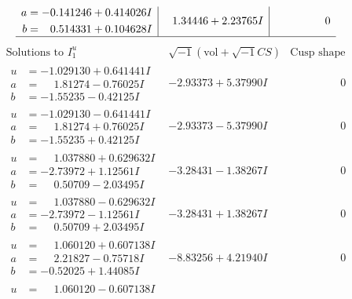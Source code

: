 \documentclass[1p]{elsarticle_modified}
\theoremstyle{definition}
\newcommand{\I}{\sqrt{-1}}
\begin{document}
$$\begin{array}{c|c|c}
\begin{aligned}
a &= -0.141246 + 0.414026 I \\
b &= \phantom{-}0.514331 + 0.104628 I\end{aligned}
 & \phantom{-}1.34446 + 2.23765 I & \phantom{-0.000000 } 0\\
 \hline 
 \end{array}$$\newpage$$\begin{array}{c|c|c}  
\text{Solutions to }I^u_{1}& \I (\text{vol} + \sqrt{-1}CS) & \text{Cusp shape}\\
 \hline 
\begin{aligned}
u &= -1.029130 + 0.641441 I \\
a &= \phantom{-}1.81274 - 0.76025 I \\
b &= -1.55235 - 0.42125 I\end{aligned}
 & -2.93373 + 5.37990 I & \phantom{-0.000000 } 0 \\ \hline\begin{aligned}
u &= -1.029130 - 0.641441 I \\
a &= \phantom{-}1.81274 + 0.76025 I \\
b &= -1.55235 + 0.42125 I\end{aligned}
 & -2.93373 - 5.37990 I & \phantom{-0.000000 } 0 \\ \hline\begin{aligned}
u &= \phantom{-}1.037880 + 0.629632 I \\
a &= -2.73972 + 1.12561 I \\
b &= \phantom{-}0.50709 - 2.03495 I\end{aligned}
 & -3.28431 - 1.38267 I & \phantom{-0.000000 } 0 \\ \hline\begin{aligned}
u &= \phantom{-}1.037880 - 0.629632 I \\
a &= -2.73972 - 1.12561 I \\
b &= \phantom{-}0.50709 + 2.03495 I\end{aligned}
 & -3.28431 + 1.38267 I & \phantom{-0.000000 } 0 \\ \hline\begin{aligned}
u &= \phantom{-}1.060120 + 0.607138 I \\
a &= \phantom{-}2.21827 - 0.75718 I \\
b &= -0.52025 + 1.44085 I\end{aligned}
 & -8.83256 + 4.21940 I & \phantom{-0.000000 } 0 \\ \hline\begin{aligned}
u &= \phantom{-}1.060120 - 0.607138 I \\

\end{aligned}
\end{array}$$
\end{document}
